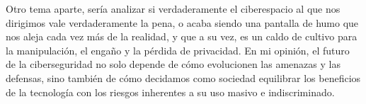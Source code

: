 Otro tema aparte, sería analizar si verdaderamente el ciberespacio al que nos dirigimos vale verdaderamente la pena, o acaba siendo una pantalla de humo que nos aleja cada vez más de la realidad, y que a su vez, es un caldo de cultivo para la manipulación, el engaño y la pérdida de privacidad. En mi opinión, el futuro de la ciberseguridad no solo depende de cómo evolucionen las amenazas y las defensas, sino también de cómo decidamos como sociedad equilibrar los beneficios de la tecnología con los riesgos inherentes a su uso masivo e indiscriminado.